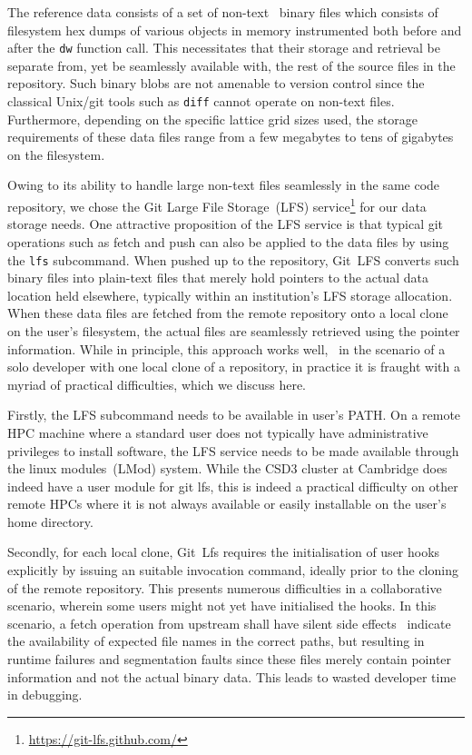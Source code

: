 \documentclass[../main]{subfiles}
\begin{document}
The reference data consists of a set of non-text \ie~binary files which consists of filesystem hex dumps of various objects in memory instrumented both before and after the \texttt{dw} function call.
This necessitates that their storage and retrieval be separate from, yet be seamlessly available with, the rest of the source files in the repository.
Such binary blobs are not amenable to version control since the classical Unix/git tools such as \texttt{diff} cannot operate on non-text files.
Furthermore, depending on the specific lattice grid sizes used, the storage requirements of these data files range from a few megabytes to tens of gigabytes on the filesystem.

Owing to its ability to handle large non-text files seamlessly in the same code repository, we chose the Git Large File Storage~(LFS) service\footnote{\url{https://git-lfs.github.com/}} for our data storage needs.
One attractive proposition of the LFS service is that typical git operations such as fetch and push can also be applied to the data files by using the \texttt{lfs} subcommand.
When pushed up to the repository, Git~LFS converts such binary files into plain-text files that merely hold pointers to the actual data location held elsewhere, typically within an institution's LFS storage allocation.
When these data files are fetched from the remote repository onto a local clone on the user's filesystem, the actual files are seamlessly retrieved using the pointer information.
While in principle, this approach works well, \eg~in the scenario of a solo developer with one local clone of a repository, in practice it is fraught with a myriad of practical difficulties, which we discuss here.

Firstly, the LFS subcommand needs to be available in user's \textsc{PATH}.
On a remote HPC machine where a standard user does not typically have administrative privileges to install software, the LFS service needs to be made available through the linux modules~(LMod) system.
While the CSD3 cluster at Cambridge does indeed have a user module for git lfs, this is indeed a practical difficulty on other remote HPCs where it is not always available or easily installable on the user's home directory.

Secondly, for each local clone, Git~Lfs requires the initialisation of user hooks explicitly by issuing an suitable invocation command, ideally prior to the cloning of the remote repository.
This presents numerous difficulties in a collaborative scenario, wherein some users might not yet have initialised the hooks.
In this scenario, a fetch operation from upstream shall have silent side effects \eg~indicate the availability of expected file names in the correct paths, but resulting in runtime failures and segmentation faults since these files merely contain pointer information and not the actual binary data.
This leads to wasted developer time in debugging.
\end{document}
